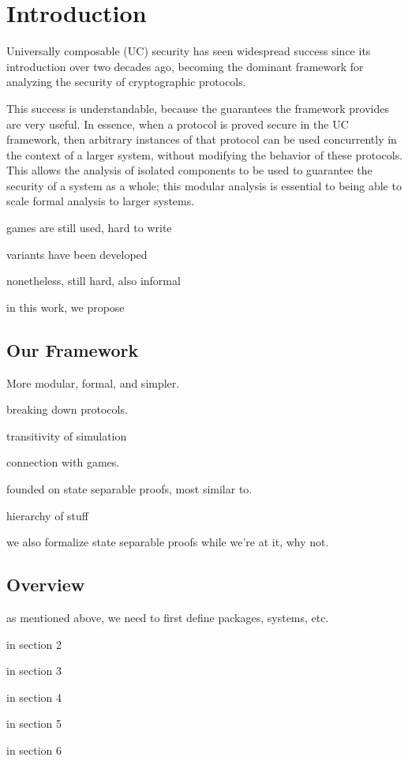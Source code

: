 \section{Introduction}

Universally composable (UC) security \cite{EPRINT:Canetti00}
has seen widespread success since its introduction over
two decades ago,
becoming the dominant framework for analyzing the security of cryptographic
protocols.

This success is understandable, because the guarantees
the framework provides are very useful.
In essence, when a protocol is proved secure in the UC framework,
then arbitrary instances of that protocol can be used concurrently in the context
of a larger system, without modifying the behavior
of these protocols.
This allows the analysis of isolated components to be used
to guarantee the security of a system as a whole;
this modular analysis is essential to being able to scale
formal analysis to larger systems.

games are still used, hard to write

variants have been developed

nonetheless, still hard, also informal

in this work, we propose

\subsection{Our Framework}

More modular, formal, and simpler.

breaking down protocols.

transitivity of simulation

connection with games.

founded on state separable proofs,
most similar to.

hierarchy of stuff

we also formalize state separable proofs while we're at it, why not.

\subsection{Overview}

as mentioned above, we need to first define packages,
systems, etc.

in section 2

in section 3

in section 4

in section 5

in section 6
